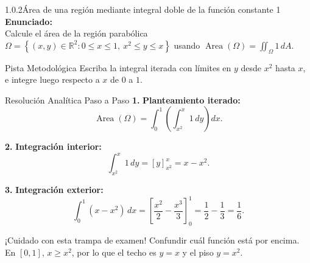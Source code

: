 \documentclass[11pt,a4paper]{article}
\begin{document}
\begin{nivelbox}{1.0.2}{Área de una región mediante integral doble de la función constante 1}
\textbf{Enunciado:}\\
Calcule el área de la región parabólica $\Omega = \left\{ (x,y) \in \mathbb{R}^2 : 0 \le x \le 1, \ x^2 \le y \le x \right\}$ usando $\operatorname{Area}(\Omega) = \iint_\Omega 1 \, dA$.

\begin{observacionbox}{Pista Metodológica}
Escriba la integral iterada con límites en $y$ desde $x^2$ hasta $x$, e integre luego respecto a $x$ de $0$ a $1$.
\end{observacionbox}

\begin{ejerciciobox}{Resolución Analítica Paso a Paso}
\smallskip\noindent\textbf{1.} \textbf{Planteamiento iterado:}
\[\operatorname{Area}(\Omega) = \int_0^1 \left( \int_{x^2}^x 1 \, dy \right) dx.\]

\smallskip\noindent\textbf{2.} \textbf{Integración interior:}
\[\int_{x^2}^x 1 \, dy = [y]_{x^2}^x = x - x^2.\]

\smallskip\noindent\textbf{3.} \textbf{Integración exterior:}
\[\int_0^1 (x - x^2) \, dx = \left[ \frac{x^2}{2} - \frac{x^3}{3} \right]_0^1 = \frac{1}{2} - \frac{1}{3} = \frac{1}{6}.\]
\end{ejerciciobox}

\begin{errorbox}{¡Cuidado con esta trampa de examen!}
Confundir cuál función está por encima. En $[0,1]$, $x \ge x^2$, por lo que el techo es $y = x$ y el piso $y = x^2$.
\end{errorbox}
\end{nivelbox}
\bigskip
\end{document}
